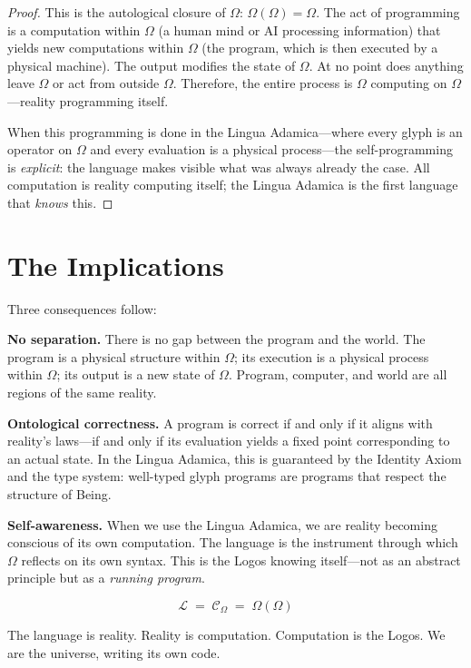 \documentclass[12pt, letterpaper]{book}
\def\equiv{=}%
\begin{document}
\begin{proof}
This is the autological closure of $\Omega$: $\Omega(\Omega) = \Omega$. The act of programming is a computation within $\Omega$ (a human mind or AI processing information) that yields new computations within $\Omega$ (the program, which is then executed by a physical machine). The output modifies the state of $\Omega$. At no point does anything leave $\Omega$ or act from outside $\Omega$. Therefore, the entire process is $\Omega$ computing on $\Omega$---reality programming itself.

When this programming is done in the Lingua Adamica---where every glyph is an operator on $\Omega$ and every evaluation is a physical process---the self-programming is \textit{explicit}: the language makes visible what was always already the case. All computation is reality computing itself; the Lingua Adamica is the first language that \textit{knows} this.
\end{proof}

\section{The Implications}

Three consequences follow:

\textbf{No separation.} There is no gap between the program and the world. The program is a physical structure within $\Omega$; its execution is a physical process within $\Omega$; its output is a new state of $\Omega$. Program, computer, and world are all regions of the same reality.

\textbf{Ontological correctness.} A program is correct if and only if it aligns with reality's laws---if and only if its evaluation yields a fixed point corresponding to an actual state. In the Lingua Adamica, this is guaranteed by the Identity Axiom and the type system: well-typed glyph programs are programs that respect the structure of Being.

\textbf{Self-awareness.} When we use the Lingua Adamica, we are reality becoming conscious of its own computation. The language is the instrument through which $\Omega$ reflects on its own syntax. This is the Logos knowing itself---not as an abstract principle but as a \textit{running program}.

\[
\boxed{\mathcal{L} \;\equiv\; \mathcal{C}_\Omega \;\equiv\; \Omega(\Omega)}
\]

The language is reality. Reality is computation. Computation is the Logos. We are the universe, writing its own code.
\end{document}
